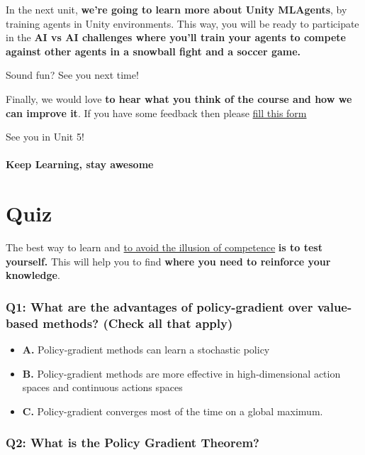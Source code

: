 \documentclass[11pt,a4paper]{article}
\begin{document}
In the next unit, \textbf{we're going to learn more about Unity MLAgents}, by training agents in Unity environments. This way, you will be ready to participate in the \textbf{AI vs AI challenges where you'll train your agents to compete against other agents in a snowball fight and a soccer game.}

Sound fun? See you next time!

Finally, we would love \textbf{to hear what you think of the course and how we can improve it}. If you have some feedback then please \href{https://forms.gle/BzKXWzLAGZESGNaE9}{fill this form}

See you in Unit 5!

\paragraph{Keep Learning, stay awesome}\label{keep-learning-stay-awesome}

\section{Quiz}\label{quiz}

The best way to learn and \href{https://www.coursera.org/lecture/learning-how-to-learn/illusions-of-competence-BuFzf}{to avoid the illusion of competence} \textbf{is to test yourself.} This will help you to find \textbf{where you need to reinforce your knowledge}.

\subsubsection{Q1: What are the advantages of policy-gradient over value-based methods? (Check all that apply)}\label{q1-what-are-the-advantages-of-policy-gradient-over-value-based-methods-check-all-that-apply}

\begin{itemize}
\tightlist
\item
  \textbf{A.} Policy-gradient methods can learn a stochastic policy
\item
  \textbf{B.} Policy-gradient methods are more effective in high-dimensional action spaces and continuous actions spaces
\item
  \textbf{C.} Policy-gradient converges most of the time on a global maximum.
\end{itemize}

\subsubsection{Q2: What is the Policy Gradient Theorem?}\label{q2-what-is-the-policy-gradient-theorem}
\end{document}
